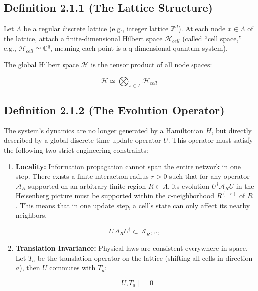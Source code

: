 \subsection{Definition 2.1.1 (The Lattice Structure)}

Let \textbf{$\Lambda$} be a regular discrete lattice (e.g., integer lattice \textbf{$\mathbb{Z}^d$}). At each node \textbf{$x \in \Lambda$} of the lattice, attach a finite-dimensional Hilbert space \textbf{$\mathcal{H}_{cell}$} (called ``cell space,'' e.g., \textbf{$\mathcal{H}_{cell} \simeq \mathbb{C}^q$}, meaning each point is a q-dimensional quantum system).

The global Hilbert space \textbf{$\mathcal{H}$} is the tensor product of all node spaces:

$$\mathcal{H} \simeq \bigotimes_{x \in \Lambda} \mathcal{H}_{cell}$$

\subsection{Definition 2.1.2 (The Evolution Operator)}

The system's dynamics are no longer generated by a Hamiltonian \textbf{$H$}, but directly described by a global discrete-time update operator \textbf{$U$}. This operator must satisfy the following two strict engineering constraints:

\begin{enumerate}
\item \textbf{Locality:} Information propagation cannot span the entire network in one step. There exists a finite interaction radius \textbf{$r > 0$} such that for any operator \textbf{$\mathcal{A}_R$} supported on an arbitrary finite region \textbf{$R \subset \Lambda$}, its evolution \textbf{$U^\dagger \mathcal{A}_R U$} in the Heisenberg picture must be supported within the \textbf{$r$}-neighborhood \textbf{$R^{(+r)}$} of \textbf{$R$}. This means that in one update step, a cell's state can only affect its nearby neighbors.

   $$U \mathcal{A}_R U^\dagger \subset \mathcal{A}_{R^{(+r)}}$$

\item \textbf{Translation Invariance:} Physical laws are consistent everywhere in space. Let \textbf{$T_a$} be the translation operator on the lattice (shifting all cells in direction \textbf{$a$}), then \textbf{$U$} commutes with \textbf{$T_a$}:

   $$[U, T_a] = 0$$
\end{enumerate}

